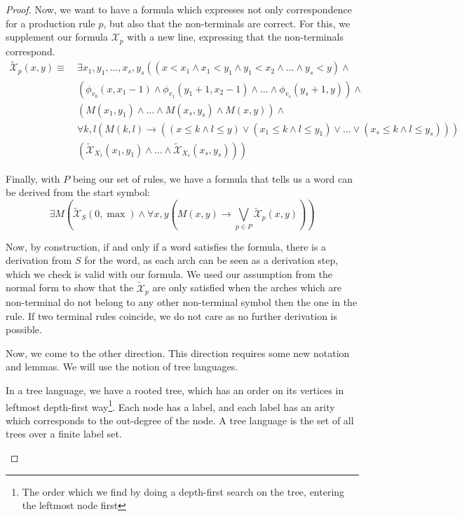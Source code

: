 \begin{proof}
    Now, we want to have a formula which expresses not only correspondence for a production rule $p$, but also that the non-terminals are correct.
    For this, we supplement our formula $\mathcal{X}_p$ with a new line, expressing that the non-terminals correspond.
    \begin{align*}
        \widetilde{\mathcal{X}}_p(x, y) \equiv~&\exists x_1, y_1, \dots, x_s, y_s \left(\left(x < x_1 \land x_1 < y_1 \land y_1 < x_2 \land \dots \land y_s < y \right) \land \right. \\
        &\left. \left(\phi_{v_0}(x, x_1 - 1) \land \phi_{v_1}(y_1 + 1, x_2 - 1) \land \dots \land \phi_{v_s}(y_s + 1, y)\right) \land \right. \\
        &\left. \left(M(x_1, y_1) \land \dots \land M(x_s, y_s) \land M(x, y) \right) \land \right. \\
        &\left. \forall k, l \left(M(k, l) \to \left((x \leq k \land l \leq y) \lor (x_1 \leq k \land l \leq y_1) \lor \dots \lor (x_s \leq k \land l \leq y_s)\right)\right) \right. \\
        &\left. \left(\widetilde{\mathcal{X}}_{X_1}(x_1, y_1) \land \dots \land \widetilde{\mathcal{X}}_{X_s}(x_s, y_s)\right)\right)
    \end{align*}

    Finally, with $P$ being our set of rules, we have a formula that tells us a word can be derived from the start symbol:
    \[
        \exists M \left(\widetilde{\mathcal{X}}_S(0, \max) \land \forall x, y \left(M(x, y) \to \bigvee_{p \in P} \widetilde{\mathcal{X}}_p(x, y) \right) \right)
    \]

    Now, by construction, if and only if a word satisfies the formula, there is a derivation from $S$ for the word, as each arch can be seen as a derivation step, which we check is valid with our formula.
    We used our assumption from the normal form to show that the $\widetilde{\mathcal{X}}_p$ are only satisfied when the arches which are non-terminal do not belong to any other non-terminal symbol then the one in the rule.
    If two terminal rules coincide, we do not care as no further derivation is possible.

    \vspace{5mm}

    Now, we come to the other direction.
    This direction requires some new notation and lemmas.
    We will use the notion of tree languages.
    \begin{define}
        In a tree language, we have a rooted tree, which has an order on its vertices in leftmost depth-first way\footnote{The order which we find by doing a depth-first search on the tree, entering the leftmost node first}.
        Each node has a label, and each label has an arity which corresponds to the out-degree of the node.
        A tree language is the set of all trees over a finite label set.


\end{define}
\end{proof}
